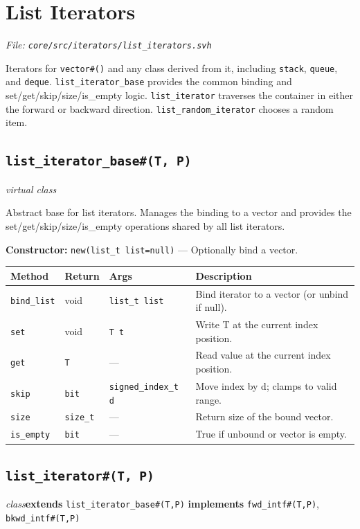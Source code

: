 \documentclass[11pt,letterpaper]{report}
\begin{document}
\section{List Iterators}
\noindent\small\textit{File: \texttt{core/src/iterators/list\_iterators.svh}}\par

Iterators for \texttt{vector\#()} and any class derived from it, including \texttt{stack}, \texttt{queue}, and \texttt{deque}. \texttt{list\_iterator\_base} provides the common binding and set/get/skip/size/is\_empty logic. \texttt{list\_iterator} traverses the container in either the forward or backward direction. \texttt{list\_random\_iterator} chooses a random item.

\subsection*{\texttt{list\_iterator\_base\#(T, P)}}
\noindent\small\textit{virtual class}\par

Abstract base for list iterators. Manages the binding to a vector and provides the set/get/skip/size/is\_empty operations shared by all list iterators.

\noindent\textbf{Constructor:} \texttt{new(list\_t list=null)} --- Optionally bind a vector.

\begin{xltabular}{\linewidth}{>{\small}p{1.35in} >{\small}p{1.25in} >{\small}p{0.95in} >{\small}X}
\toprule
\textbf{Method} & \textbf{Return} & \textbf{Args} & \textbf{Description} \\
\midrule
\endhead
\bottomrule
\endfoot
\texttt{bind\_list} & void & \texttt{list\_t list} & Bind iterator to a vector (or unbind if null). \\
\texttt{set} & void & \texttt{T t} & Write T at the current index position. \\
\texttt{get} & \texttt{T} & --- & Read value at the current index position. \\
\texttt{skip} & \texttt{bit} & \texttt{signed\_index\_t d} & Move index by d; clamps to valid range. \\
\texttt{size} & \texttt{size\_t} & --- & Return size of the bound vector. \\
\texttt{is\_empty} & \texttt{bit} & --- & True if unbound or vector is empty. \\
\end{xltabular}

\subsection*{\texttt{list\_iterator\#(T, P)}}
\noindent\small\textit{class}\quad \textbf{extends} \texttt{list\_iterator\_base\#(T,P)} \quad \textbf{implements} \texttt{fwd\_intf\#(T,P)}, \texttt{bkwd\_intf\#(T,P)}\par
\end{document}
